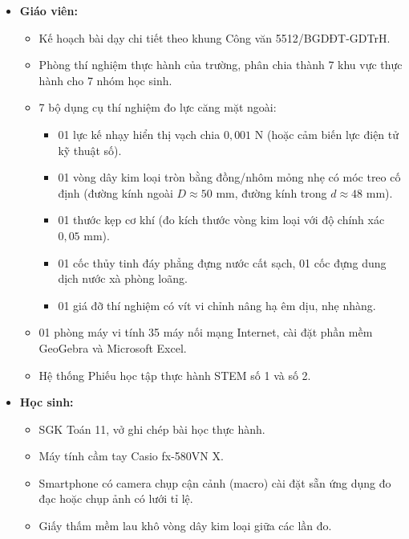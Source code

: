 \documentclass[12pt, a4paper]{article}
\begin{document}
\begin{itemize}[leftmargin=1.2cm]
    \item \textbf{Giáo viên:}
    \begin{itemize}[leftmargin=0.6cm]
        \item Kế hoạch bài dạy chi tiết theo khung Công văn 5512/BGDĐT-GDTrH.
        \item Phòng thí nghiệm thực hành của trường, phân chia thành 7 khu vực thực hành cho 7 nhóm học sinh.
        \item 7 bộ dụng cụ thí nghiệm đo lực căng mặt ngoài:
        \begin{itemize}
            \item 01 lực kế nhạy hiển thị vạch chia $0{,}001\text{ N}$ (hoặc cảm biến lực điện tử kỹ thuật số).
            \item 01 vòng dây kim loại tròn bằng đồng/nhôm mỏng nhẹ có móc treo cố định (đường kính ngoài $D \approx 50\text{ mm}$, đường kính trong $d \approx 48\text{ mm}$).
            \item 01 thước kẹp cơ khí (đo kích thước vòng kim loại với độ chính xác $0{,}05\text{ mm}$).
            \item 01 cốc thủy tinh đáy phẳng đựng nước cất sạch, 01 cốc đựng dung dịch nước xà phòng loãng.
            \item 01 giá đỡ thí nghiệm có vít vi chỉnh nâng hạ êm dịu, nhẹ nhàng.
        \end{itemize}
        \item 01 phòng máy vi tính 35 máy nối mạng Internet, cài đặt phần mềm GeoGebra và Microsoft Excel.
        \item Hệ thống Phiếu học tập thực hành STEM số 1 và số 2.
    \end{itemize}

    \item \textbf{Học sinh:}
    \begin{itemize}[leftmargin=0.6cm]
        \item SGK Toán 11, vở ghi chép bài học thực hành.
        \item Máy tính cầm tay Casio fx-580VN X.
        \item Smartphone có camera chụp cận cảnh (macro) cài đặt sẵn ứng dụng đo đạc hoặc chụp ảnh có lưới tỉ lệ.
        \item Giấy thấm mềm lau khô vòng dây kim loại giữa các lần đo.
    \end{itemize}
\end{itemize}
\end{document}
